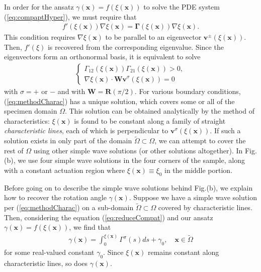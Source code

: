 \documentclass[aps,11pt,tightenlines,notitlepage,superscriptaddress,longbibliography,nofootinbib]{revtex4-1}
\begin{document}
In order for the ansatz $\gamma(\mathbf{x}) = f(\xi(\mathbf{x}))$ to solve the PDE system (\ref{eq:compaptHyper}), we must require that 
\begin{equation}
\begin{aligned}\label{eq:reduceCompat}
f'(\xi(\mathbf{x})) \nabla \xi(\mathbf{x}) = \boldsymbol{\Gamma}(\xi(\mathbf{x})) \nabla \xi(\mathbf{x}).
\end{aligned}
\end{equation}
This condition requires $\nabla \xi(\mathbf{x})$ to be parallel to an  eigenvector $\mathbf{v}^{\pm}(\xi(\mathbf{x}))$. Then, $f'(\xi)$ is recovered from the corresponding eigenvalue.   Since the eigenvectors form an orthonormal basis, it is equivalent to solve 
\begin{equation}
\begin{aligned}
\begin{cases}\label{eq:methodCharac}
\Gamma_{12}(\xi(\mathbf{x})) \Gamma_{21}(\xi(\mathbf{x})) > 0,\\
\nabla \xi(\mathbf{x}) \cdot \mathbf{W} \mathbf{v}^{\sigma}(\xi(\mathbf{x})) = 0
\end{cases}
\end{aligned}
\end{equation}
with $\sigma= +$ or $-$ and with $\mathbf{W} = \mathbf{R}(\pi/2)$. For various boundary conditions,  (\ref{eq:methodCharac}) has a unique solution, which covers some or all of the specimen domain $\Omega$. This solution can be obtained analytically by the method of characteristics:  $\xi(\mathbf{x})$ is found to be constant along a family of straight \textit{characteristic lines}, each of which is perpendicular to $\mathbf{v}^{\sigma}(\xi(\mathbf{x}))$. If such a solution exists in only part of the domain $\tilde{\Omega} \subset \Omega$, we can attempt to cover the rest of $\Omega$ using other simple wave solutions (or other solutions altogether). In Fig.(b), we use four simple wave solutions in the four corners of the sample, along with a constant actuation region where $\xi(\mathbf{x})\equiv \xi_0$ in the middle portion.

Before going on to describe the simple wave solutions behind Fig.(b), we explain how to recover the rotation angle $\gamma(\mathbf{x})$. Suppose we have a simple wave solution per (\ref{eq:methodCharac}) on a sub-domain $\tilde{\Omega} \subset \Omega$ covered by characteristic lines.  Then, considering the equation (\ref{eq:reduceCompat}) and our ansatz $\gamma(\mathbf{x}) = f(\xi(\mathbf{x}))$, we find that 
\begin{equation}
\begin{aligned}\label{eq:gammaSolve}
\gamma(\mathbf{x}) = \int_0^{\xi(\mathbf{x})} \Gamma^{\sigma}(s) ds + \gamma_0, \quad \mathbf{x}\in\tilde{\Omega}
\end{aligned}
\end{equation}
for some real-valued constant $\gamma_0$. Since $\xi(\mathbf{x})$ remains constant along characteristic lines, so does $\gamma(\mathbf{x})$.
\end{document}
